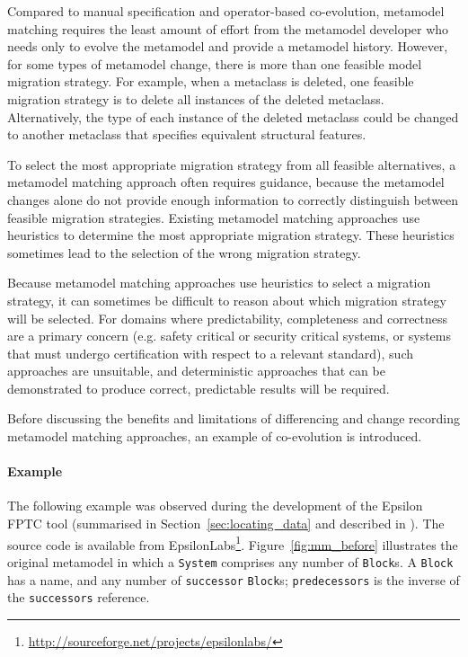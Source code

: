 Compared to manual specification and operator-based co-evolution, metamodel matching requires the least amount of effort from the metamodel developer who needs only to evolve the metamodel and provide a metamodel history. However, for some types of metamodel change, there is more than one feasible model migration strategy. For example, when a metaclass is deleted, one feasible migration strategy is to delete all instances of the deleted metaclass. Alternatively, the type of each instance of the deleted metaclass could be changed to another metaclass that specifies equivalent structural features.

To select the most appropriate migration strategy from all feasible alternatives, a metamodel matching approach often requires guidance, because the metamodel changes alone do not provide enough information to correctly distinguish between feasible migration strategies. Existing metamodel matching approaches use heuristics to determine the most appropriate migration strategy. These heuristics sometimes lead to the selection of the wrong migration strategy.

Because metamodel matching approaches use heuristics to select a migration strategy, it can sometimes be difficult to reason about which migration strategy will be selected. For domains where predictability, completeness and correctness are a primary concern (e.g. safety critical or security critical systems, or systems that must undergo certification with respect to a relevant standard), such approaches are unsuitable, and deterministic approaches that can be demonstrated to produce correct, predictable results will be required. 

Before discussing the benefits and limitations of differencing and change recording metamodel matching approaches, an example of co-evolution is introduced.

\paragraph{Example}
\label{subsubsec:example}
The following example was observed during the development of the Epsilon FPTC tool (summarised in Section~\ref{sec:locating_data} and described in \cite{paige08fptc}). The source code is available from EpsilonLabs\footnote{\url{http://sourceforge.net/projects/epsilonlabs/}}. Figure~\ref{fig:mm_before} illustrates the original metamodel in which a \texttt{System} comprises any number of \texttt{Block}s. A \texttt{Block} has a name, and any number of \texttt{successor} \texttt{Block}s; \texttt{predecessors} is the inverse of the \texttt{successors} reference.

